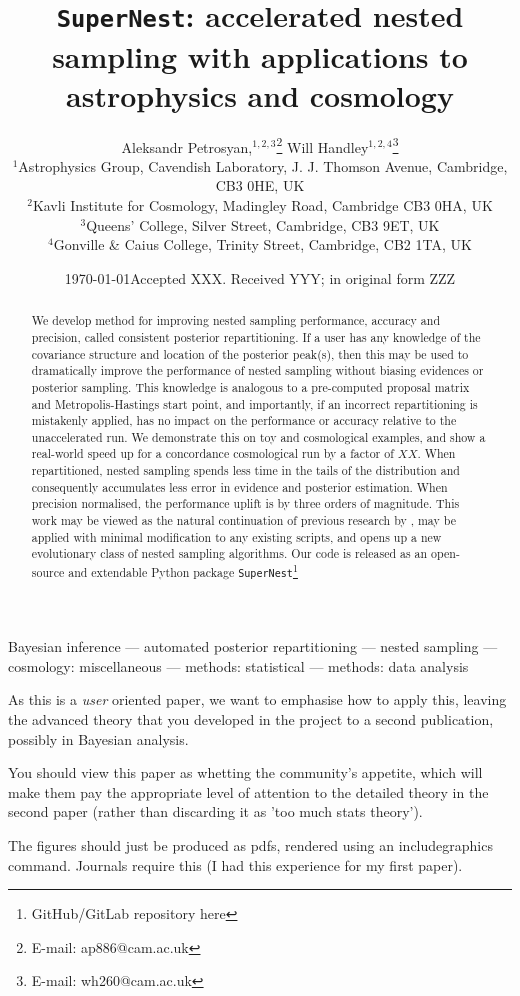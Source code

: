 \documentclass[usenatbib]{mnras}
\date{\today}
\title[\texttt{SuperNest}]{\texttt{SuperNest}: accelerated nested sampling with applications to astrophysics and cosmology}
\author[Petrosyan \& Handley]{
    Aleksandr Petrosyan,$^{1,2,3}$\thanks{E-mail: ap886@cam.ac.uk}
    Will Handley$^{1,2,4}$\thanks{E-mail: wh260@cam.ac.uk}
\\
$^{1}$Astrophysics Group, Cavendish Laboratory, J. J. Thomson Avenue, Cambridge, CB3 0HE, UK\\
$^{2}$Kavli Institute for Cosmology, Madingley Road, Cambridge CB3 0HA, UK \\
$^{3}$Queens' College, Silver Street, Cambridge, CB3 9ET, UK \\
$^{4}$Gonville \& Caius College, Trinity Street, Cambridge, CB2 1TA, UK
}
\date{Accepted XXX. Received YYY; in original form ZZZ}
\begin{document}
\maketitle
\begin{abstract}
    We develop method for improving nested sampling performance, accuracy and precision, called consistent posterior repartitioning. If a user has any knowledge of the covariance structure and location of the posterior peak(s), then this may be used to dramatically improve the performance of nested sampling without biasing evidences or posterior sampling.
    This knowledge is analogous to a pre-computed proposal matrix and Metropolis-Hastings start point, and importantly, if an incorrect repartitioning is mistakenly applied, has no impact on the performance or accuracy relative to the unaccelerated run.
    We demonstrate this on toy and cosmological examples, and show a real-world speed up for a concordance cosmological run by a factor of \(XX\). When repartitioned, nested sampling spends less time in the tails of the distribution and consequently accumulates less error in evidence and posterior estimation. When precision normalised, the performance uplift is by three orders of magnitude.
    This work may be viewed as the natural continuation of previous research by \citet{chen-ferroz-hobson}, may be applied with minimal modification to any existing scripts, and opens up a new evolutionary class of nested sampling algorithms.
    Our code is released as an open-source and extendable Python package \texttt{SuperNest}\footnote{GitHub/GitLab repository here}
\end{abstract}

\begin{keywords}
Bayesian inference --- automated posterior repartitioning --- nested sampling --- cosmology: miscellaneous --- methods: statistical --- methods: data analysis
\end{keywords}

As this is a {\em user\/} oriented paper, we want to emphasise how to apply this, leaving the advanced theory that you developed in the project to a second publication, possibly in Bayesian analysis.

You should view this paper as whetting the community's appetite, which will make them pay the appropriate level of attention to the detailed theory in the second paper (rather than discarding it as 'too much stats theory').

The figures should just be produced as pdfs, rendered using an includegraphics command. Journals require this (I had this experience for my first paper).
\end{document}
